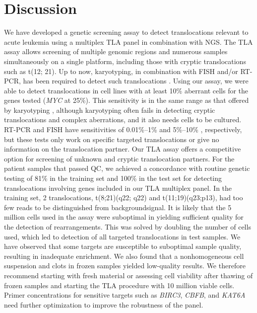 \section{Discussion}\label{discussion}
We have developed a genetic screening assay to detect translocations relevant to acute leukemia using a multiplex TLA panel in combination with NGS. 
The TLA assay allows screening of multiple genomic regions and numerous samples simultaneously on a single platform, including those with cryptic translocations such as t(12; 21).
Up to now, karyotyping, in combination with FISH and/or RT-PCR, has been required to detect such translocations \cite{Sandberg_2010}. 
Using our assay, we were able to detect translocations in cell lines with at least 10\% aberrant cells for the genes tested (\textsl{MYC} at 25\%). 
This sensitivity is in the same range as that offered by karyotyping \cite{Pinkel_1986, Buzzard_2004}, although karyotyping often fails in detecting cryptic translocations and complex aberrations, and it also needs cells to be cultured. 
RT-PCR and FISH have sensitivities of 0.01\%–1\% \cite{Burmeister_2015,Salto_Tellez_2003} and 5\%–10\% \cite{Schoch_2002,Aypar_2014,Liew_2016}, respectively, but these tests only work on specific targeted translocations or give no information on the translocation partner. 
Our TLA assay offers a competitive option for screening of unknown and cryptic translocation partners. 
For the patient samples that passed QC, we achieved a concordance with routine genetic testing of 81\% in the training set and 100\% in the test set for detecting translocations involving genes included in our TLA multiplex panel. 
In the training set, 2 translocations, t(8;21)(q22; q22) and t(11;19)(q23;p13), had too few reads to be distinguished from backgroundsignal.
It is likely that the 5 million cells used in the assay were suboptimal in yielding sufficient quality for the detection of rearrangements. 
This was solved by doubling the number of cells used, which led to detection of all targeted translocations in test samples. 
We have observed that some targets are susceptible to suboptimal sample quality, resulting in inadequate enrichment. 
We also found that a nonhomogeneous cell suspension and clots in frozen samples yielded low-quality results. 
We therefore recommend starting with fresh material or assessing cell viability after thawing of frozen samples and starting the TLA procedure with 10 million viable cells. 
Primer concentrations for sensitive targets such as \textsl{BIRC3}, \textsl{CBFB}, and \textsl{KAT6A} need further optimization to improve the robustness of the panel. 
